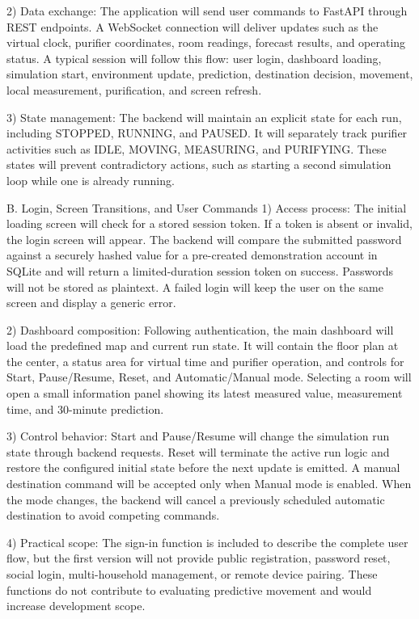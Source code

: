 2) Data exchange: 
The application will send user commands to FastAPI through REST endpoints. A WebSocket connection will deliver updates such as the virtual clock, purifier coordinates, room readings, forecast results, and operating status. A typical session will follow this flow: user login, dashboard loading, simulation start, environment update, prediction, destination decision, movement, local measurement, purification, and screen refresh.

3) State management:
The backend will maintain an explicit state for each run, including STOPPED, RUNNING, and PAUSED. It will separately track purifier activities such as IDLE, MOVING, MEASURING, and PURIFYING. These states will prevent contradictory actions, such as starting a second simulation loop while one is already running.

B. Login, Screen Transitions, and User Commands
1) Access process:
The initial loading screen will check for a stored session token. If a token is absent or invalid, the login screen will appear. The backend will compare the submitted password against a securely hashed value for a pre-created demonstration account in SQLite and will return a limited-duration session token on success. Passwords will not be stored as plaintext. A failed login will keep the user on the same screen and display a generic error.

2) Dashboard composition:
Following authentication, the main dashboard will load the predefined map and current run state. It will contain the floor plan at the center, a status area for virtual time and purifier operation, and controls for Start, Pause/Resume, Reset, and Automatic/Manual mode. Selecting a room will open a small information panel showing its latest measured value, measurement time, and 30-minute prediction.

3) Control behavior:
Start and Pause/Resume will change the simulation run state through backend requests. Reset will terminate the active run logic and restore the configured initial state before the next update is emitted. A manual destination command will be accepted only when Manual mode is enabled. When the mode changes, the backend will cancel a previously scheduled automatic destination to avoid competing commands.

4) Practical scope:
The sign-in function is included to describe the complete user flow, but the first version will not provide public registration, password reset, social login, multi-household management, or remote device pairing. These functions do not contribute to evaluating predictive movement and would increase development scope.

